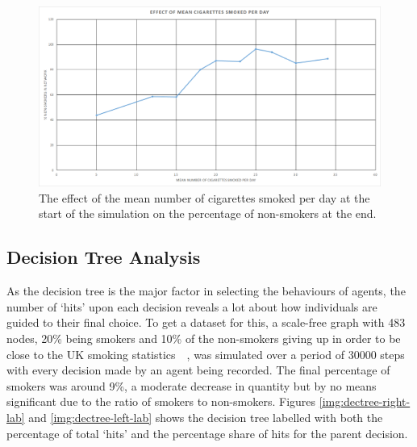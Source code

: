 \documentclass[]{report}
\begin{document}
\begin{figure}
\begin{center}
\includegraphics[width=\textwidth]{mean-cig.png}
\end{center}
\caption{The effect of the mean number of cigarettes smoked per day at the start of the simulation on the percentage of non-smokers at the end.}
\label{img:mean-cig}
\end{figure}


\subsection{Decision Tree Analysis}
As the decision tree is the major factor in selecting the behaviours of agents, the number of `hits' upon each decision reveals a lot about how individuals are guided to their final choice. To get a dataset for this, a scale-free graph with 483 nodes, 20\% being smokers and 10\% of the non-smokers giving up in order to be close to the UK smoking statistics~\cite{NHS-12}~\cite{NHS-43}, was simulated over a period of 30000 steps with every decision made by an agent being recorded. The final percentage of smokers was around 9\%, a moderate decrease in quantity but by no means significant due to the ratio of smokers to non-smokers. Figures \ref{img:dectree-right-lab} and \ref{img:dectree-left-lab}  shows the decision tree labelled with both the percentage of total `hits' and the percentage share of hits for the parent decision.
\end{document}
